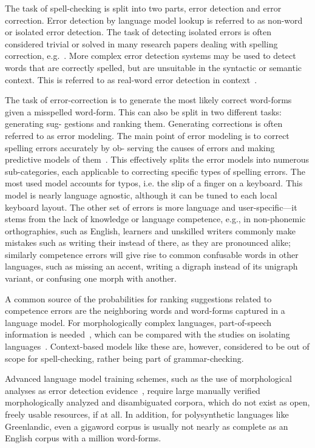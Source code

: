 \documentclass[postprint]{flammie}
\begin{document}
The task of spell-checking is split into two parts, error detection and error
correction. Error detection by language model lookup is referred to as
non-word or isolated error detection. The task of detecting isolated errors is
often considered trivial or solved in many research papers dealing with
spelling correction, e.g.~\cite{otero2007contextual}. More complex error
detection systems may be used to detect words that are correctly spelled, but
are unsuitable in the syntactic or semantic context. This is referred to as
real-word error detection in context~\cite{mays1991context}.

The task of error-correction is to generate the most likely correct word-forms
given a misspelled word-form. This can also be split in two different tasks:
generating sug- gestions and ranking them. Generating corrections is often
referred to as error modeling. The main point of error modeling is to correct
spelling errors accurately by ob- serving the causes of errors and making
predictive models of them~\cite{deorowicz2005correcting}. This effectively
splits the error models into numerous sub-categories, each applicable to
correcting specific types of spelling errors. The most used model accounts for
typos, i.e. the slip of a finger on a keyboard. This model is nearly language
agnostic, although it can be tuned to each local keyboard layout. The other set
of errors is more language and user-specific—it stems from the lack of
knowledge or language competence, e.g., in non-phonemic orthographies, such as
English, learners and unskilled writers commonly make mistakes such as
writing their instead of there, as they are pronounced alike; similarly
competence errors will give rise to common confusable words in other languages,
such as missing an accent, writing a digraph instead of its unigraph variant,
or confusing one morph with another.

A common source of the probabilities for ranking suggestions related to
competence errors are the neighboring words and word-forms captured in a
language model.  For morphologically complex languages, part-of-speech
information is needed~\cite{otero2007contextual,pirinen2012improving}, which
can be compared with the studies on isolating
languages~\cite{mays1991context,wilcoxohearn2008realword}. Context-based models
like these are, however, considered to be out of scope for spell-checking,
rather being part of grammar-checking.

Advanced language model training schemes, such as the use of morphological
analyses as error detection evidence~\cite{mays1991context}, require large
manually verified morphologically analyzed and disambiguated corpora, which do
not exist as open, freely usable resources, if at all. In addition, for
polysynthetic languages like Greenlandic, even a gigaword corpus is usually not
nearly as complete as an English corpus with a million word-forms.
\end{document}
